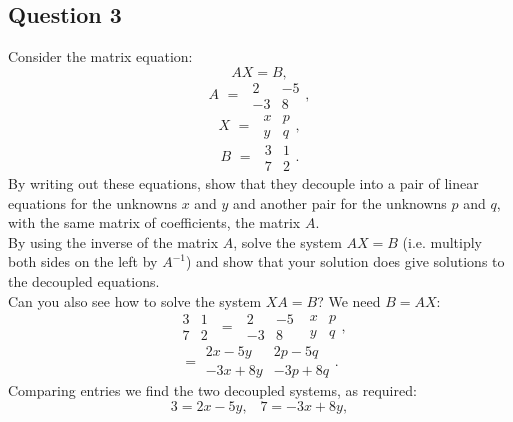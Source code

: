 \documentclass[12pt]{article}
\begin{document}
\subsection*{Question 3}
Consider the matrix equation:
\[ AX = B, \]
\[ A\hspace{4pt} = \hspace{4pt} \begin{array}{|cc|}2&-5\\-3&8\end{array},\]
\[ X\hspace{4pt} = \hspace{4pt}\begin{array}{|cc|}x&p\\y&q\end{array},\]
\[ B\hspace{4pt} = \hspace{4pt}\begin{array}{|cc|}3&1\\7&2\end{array}.\]
By writing out these equations, show that they decouple into a pair of linear equations for the unknowns $x$ and $y$ and another pair for the unknowns $p$ and $q$, with the same matrix of coefficients, the matrix $A$.\\
By using the inverse of the matrix $A$, solve the system $AX = B$ (i.e. multiply both sides on the left by $A^{-1}$) and show that your solution does give solutions to the decoupled equations.\\
Can you also see how to solve the system $XA = B$?
We need $B = AX$:
\[  \hspace{4pt}\begin{array}{|cc|}3&1\\7&2\end{array}\hspace{4pt} = \hspace{4pt} \begin{array}{|cc|}2&-5\\-3&8\end{array} \hspace{4pt}\begin{array}{|cc|}x&p\\y&q\end{array},\]
\[ = \begin{array}{|cc|}2x -5y&2p - 5q\\-3x + 8y&-3p + 8q\end{array}.\]
Comparing entries we find the two decoupled systems, as required:
\[ 3 = 2x - 5y, \hspace{10pt} 7 = -3x + 8y, \]
\end{document}
